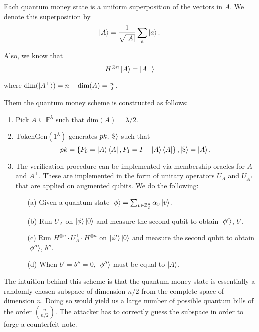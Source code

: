 \documentclass[]{article}
\newcommand{\F}{\mathbb F}
\begin{document}
Each quantum money state is a uniform superposition of the vectors in $A$. We denote this superposition by
\[
\ket{A} = \frac{1}{\sqrt {\vert A\vert}} \sum_{a} \ket{a}.
\]

Also, we know that
\[
H^{\otimes n} \ket{A} = \ket{A^\perp}
\]

where $\text{dim}(\ket{A^\perp}) = n - \text{dim}(A) = \frac{n}{2}$.

Them the quantum money scheme is constructed as follows:

\begin{enumerate}
    \item Pick $A \subseteq \F^\lambda$ such that $\text{dim}(A) = \lambda/2$.
    \item $\text{TokenGen}(1^\lambda)$ generates $pk, \ket{\$}$ such that
    \[
    pk = \left\{ P_0 = \ket{A} \bra{A}, P_1 = I - \ket{A} \bra{A} \right\}, \ket{\$} = \ket{A}.
    \]
   \item The verification procedure can be implemented via membership oracles for $A$ and  $A^\perp$. These are implemented in the form of unitary operators $U_A$ and $U_{A^\perp}$ that are applied on augmented qubits. We do the following:

    \begin{enumerate}
        \item[(a)] Given a quantum state $\ket{\phi} = \sum_{v\in\mathbb{Z}^{n}_2} \alpha_v \ket{v}$.
        
        \item[(b)] Run $U_A$ on $\ket{\phi} \ket{0}$ and measure the second qubit to obtain $\ket{\phi'}$, $b'$.
        
        \item[(c)] Run $H^{\otimes n} \cdot U_A^\perp \cdot H^{\otimes n}$ on $\ket{\phi'} \ket{0}$ and measure the second qubit to obtain $\ket{\phi''}$, $b''$.
        
        \item[(d)] When $b' = b'' = 0$, $\ket{\phi''}$ must be equal to $\ket{A}$.
    \end{enumerate}
\end{enumerate}

The intuition behind this scheme is that the quantum money state is essentially a randomly chosen subspace of dimension $n/2$ from the complete space of dimension $n$. Doing so would yield us a large number of possible quantum bills of the order $n \choose n/2$. The attacker has to correctly guess the subspace in order to forge a counterfeit note.
\end{document}
